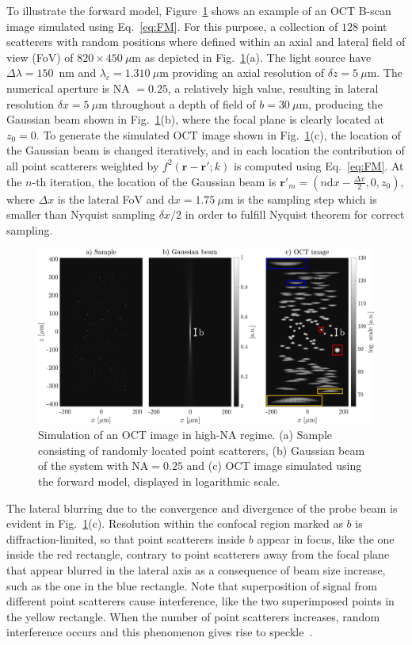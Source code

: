 To illustrate the forward model, Figure~\ref{fig:FM1} shows an example of an OCT B-scan image simulated using Eq.~\ref{eq:FM}. For this purpose, a collection of $128$ point scatterers with random positions where defined within an axial and lateral field of view (FoV) of $820\times 450~\mu$m as depicted in Fig.~\ref{fig:FM1}(a). The light source have $\Delta\lambda=150$~nm and $\lambda_c=1.310~\mu$m providing an axial resolution of $\delta z=5~\mu$m. The numerical aperture is NA $= 0.25$, a relatively high value, resulting in lateral resolution $\delta x=5~\mu$m throughout a depth of field of $b=30~\mu$m, producing the Gaussian beam shown in Fig.~\ref{fig:FM1}(b), where the focal plane is clearly located at $z_0=0$. To generate the simulated OCT image shown in Fig.~\ref{fig:FM1}(c), the location of the Gaussian beam is changed iteratively, and in each location the contribution of all point scatterers weighted by $f^2(\mathbf{r}-\mathbf{r'}; k)$ is computed using Eq.~\ref{eq:FM}. At the $n$-th iteration, the location of the Gaussian beam is $\mathbf{r}'_m=(n\text{d}x - \frac{\Delta x}{2},0,z_0)$, where $\Delta x$ is the lateral FoV and $\text{d}x = 1.75~\mu$m is the sampling step which is smaller than Nyquist sampling $\delta x / 2$ in order to fulfill Nyquist theorem for correct sampling.

\begin{figure}[htb!]
    \centering
    \includegraphics[width=\textwidth]{Figures/TheoreticalBasis/FM-HighNA.pdf}
    \caption{Simulation of an OCT image in high-NA regime. (a) Sample consisting of randomly located point scatterers, (b) Gaussian beam of the system with NA$=0.25$ and (c) OCT image simulated using the forward model, displayed in logarithmic scale.}
    \label{fig:FM1}
\end{figure}

The lateral blurring due to the convergence and divergence of the probe beam is evident in Fig.~\ref{fig:FM1}(c). Resolution within the confocal region marked as $b$ is diffraction-limited, so that point scatterers inside $b$ appear in focus, like the one inside the red rectangle, contrary to point scatterers away from the focal plane that appear blurred in the lateral axis as a consequence of beam size increase, such as the one in the blue rectangle. Note that superposition of signal from different point scatterers cause interference, like the two superimposed points in the yellow rectangle. When the number of point scatterers increases, random interference occurs and this phenomenon gives rise to speckle~\cite{Goodman2007_Speckle}.

